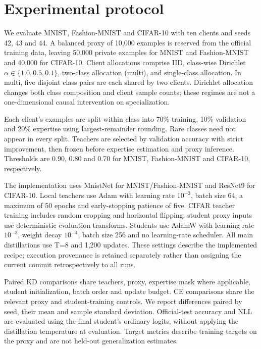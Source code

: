 \hypertarget{experimental-protocol}{%
\section{Experimental protocol}\label{experimental-protocol}}

We evaluate MNIST, Fashion-MNIST and CIFAR-10 with ten clients and seeds 42, 43 and 44. A balanced proxy of 10,000 examples is reserved from the official training data, leaving 50,000 private examples for MNIST and Fashion-MNIST and 40,000 for CIFAR-10. Client allocations comprise IID, class-wise Dirichlet \(\alpha\in\{1.0,0.5,0.1\}\), two-class allocation (multi), and single-class allocation. In multi, five disjoint class pairs are each shared by two clients. Dirichlet allocation changes both class composition and client sample counts; these regimes are not a one-dimensional causal intervention on specialization.

Each client's examples are split within class into 70\% training, 10\% validation and 20\% expertise using largest-remainder rounding. Rare classes need not appear in every split. Teachers are selected by validation accuracy with strict improvement, then frozen before expertise estimation and proxy inference. Thresholds are 0.90, 0.80 and 0.70 for MNIST, Fashion-MNIST and CIFAR-10, respectively.

The implementation uses MnistNet for MNIST/Fashion-MNIST and ResNet9 for CIFAR-10. Local teachers use Adam with learning rate \(10^{-3}\), batch size 64, a maximum of 50 epochs and early-stopping patience of five. CIFAR teacher training includes random cropping and horizontal flipping; student proxy inputs use deterministic evaluation transforms. Students use AdamW with learning rate \(10^{-3}\), weight decay \(10^{-4}\), batch size 256 and no learning-rate scheduler. All main distillations use T=8 and 1,200 updates. These settings describe the implemented recipe; execution provenance is retained separately rather than assigning the current commit retrospectively to all runs.

Paired KD comparisons share teachers, proxy, expertise mask where applicable, student initialization, batch order and update budget. CE comparisons share the relevant proxy and student-training controls. We report differences paired by seed, their mean and sample standard deviation. Official-test accuracy and NLL are evaluated using the final student's ordinary logits, without applying the distillation temperature at evaluation. Target metrics describe training targets on the proxy and are not held-out generalization estimates.

